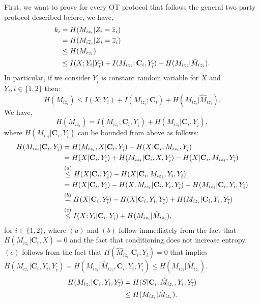 \documentclass[runningheads]{llncs}
\newcounter{protocol}
\begin{document}
First, we want to prove for every OT protocol that follows the general two party protocol described before, we have,
\begin{align}
    \label{eq. SKA-main1}
    k_i &= H(M_{iz_i}|Z_i=\overline{z}_i) \notag\\
    & = H(M_{i\overline{z}_i}|Z_i=\overline{z}_i)\notag\\
    & \leq H(M_{iz_i})\notag\\
    & \leq I(X; Y_i | Y_{\overline{i}})+ I(M_{iz_i}; \mathbf{C}_i, Y_{\overline{i}}) + H(M_{iz_i} | \hat{M}_{iz_i}).
\end{align}
In particular, if we consider $Y_{\overline{i}}$ is constant random variable for $X$ and $Y_i, i\in\{1,2\}$ then:
\begin{equation}\label{eq. SKA-main2}
    H(M_{iz_i}) \leq I(X; Y_i) + I(M_{iz_i}; \mathbf{C}_i) + H(M_{iz_i} | \hat{M}_{iz_i}).
\end{equation}
We have,
\begin{equation}\label{eq. SKA1}
    H(M_{iz_i}) = I(M_{iz_i}; \mathbf{C}_i ,Y_{\overline{i}}) + H(M_{iz_i} | \mathbf{C}_i , Y_{\overline{i}}), 
\end{equation}
where $H(M_{iz_i} | \mathbf{C}_i, Y_{\overline{i}})$ can be bounded from above as follows:
\begin{align}\label{eq. SKA2}
H(M_{iz_i} | \mathbf{C}_i, Y_{\overline{i}}) &= H(M_{iz_i},X | \mathbf{C}_i, Y_{\overline{i}}) - H(X | \mathbf{C}_i, M_{iz_i},Y_{\overline{i}})\notag \\
&= H(X | \mathbf{C}_i, Y_{\overline{i}}) + H(M_{iz_i} | \mathbf{C}_i, X,Y_{\overline{i}}) - H(X | \mathbf{C}_i, M_{iz_i},Y_{\overline{i}}) \notag\\
&\stackrel{(a)}{\leq} H(X | \mathbf{C}_i, Y_{\overline{i}}) - H(X  | \mathbf{C}_i, M_{iz_i},Y_i,Y_{\overline{i}})\notag\\
& = H(X | \mathbf{C}_i, Y_{\overline{i}}) - H(X,M_{iz_i} | \mathbf{C}_i, Y_i,Y_{\overline{i}}) + H(M_{iz_i} | \mathbf{C}_i, Y_i,Y_{\overline{i}})\notag \\
&\stackrel{(b)}{=} H(X | \mathbf{C}_i, Y_{\overline{i}}) - H(X | \mathbf{C}_i, Y_i,Y_{\overline{i}}) + H(M_{iz_i} | \mathbf{C}_i, Y_i,Y_{\overline{i}}) \notag\\
&\stackrel{(c)}{\leq} I(X; Y_i | \mathbf{C}_i, Y_{\overline{i}}) + H(M_{iz_i} | \hat{M}_{iz_i}), 
\end{align}
for $i\in\{1,2\}$,  where $(a)$ and $(b)$ follow immediately from the fact that\linebreak $H(M_{iz_i}|\mathbf{C}_i, X) = 0$ and the fact that conditioning does not increase entropy. $(c)$ follows from the fact that $H(\hat{M}_{iz_i}|\mathbf{C}_i, Y_i) = 0$ that implies $H(M_{iz_i} | \mathbf{C}_i ,Y_i,Y_{\overline{i}}) = H(M_{iz_i} | \hat{M}_{iz_i},\mathbf{C}_i, Y_i,Y_{\overline{i}}) \leq H(M_{iz_i}|\hat{M}_{iz_i})$. 
\begin{align}
    H(M_{iz_i} | \mathbf{C}_i, Y_i,Y_{\overline{i}}) & = H(S | \mathbf{C}_i, \hat{M}_{iz_i}, Y_i,Y_{\overline{i}})\notag\\
    & \leq H(M_{iz_i} | \hat{M}_{iz_i}).
\end{align}
\end{document}
